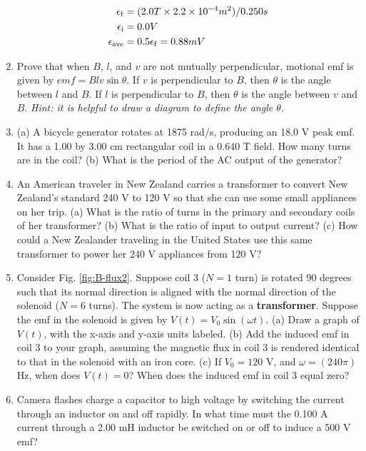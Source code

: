 \documentclass[12pt,twocolumn]{article}
\begin{document}
\begin{enumerate}
\begin{align}
\epsilon_{\rm f} &= (2.0 T \times 2.2\times 10^{-4} m^2)/0.250 s \\
\epsilon_{\rm i} &= 0.0 V \\
\epsilon_{\rm ave} &= 0.5\epsilon_{\rm f} = 0.88 mV
\end{align}
\item Prove that when $B$, $l$, and $v$ are not mutually perpendicular, motional emf is given by $emf = Blv\sin\theta$. If $v$ is perpendicular to $B$, then $\theta$ is the angle between $l$ and $B$. If $l$ is perpendicular to $B$, then $\theta$ is the angle between $v$ and $B$. \textit{Hint: it is helpful to draw a diagram to define the angle $\theta$.}\\ \vspace{6cm}
\item (a) A bicycle generator rotates at 1875 rad/s, producing an 18.0 V peak emf. It has a 1.00 by 3.00 cm rectangular coil in a 0.640 T field. How many turns are in the coil? (b) What is the period of the AC output of the generator?  \\ \vspace{3cm}
\item An American traveler in New Zealand carries a transformer to convert New Zealand's standard 240 V to 120 V so that she can use some small appliances on her trip. (a) What is the ratio of turns in the primary and secondary coils of her transformer? (b) What is the ratio of input to output current? (c) How could a New Zealander traveling in the United States use this same transformer to power her 240 V appliances from 120 V? \\ \vspace{3cm}
\item Consider Fig. \ref{fig:B-flux2}.  Suppose coil 3 ($N=1$ turn) is rotated 90 degrees such that its normal direction is aligned with the normal direction of the solenoid ($N=6$ turns).  The system is now acting as a \textbf{transformer}.  Suppose the emf in the solenoid is given by $V(t) = V_0 \sin(\omega t)$. (a) Draw a graph of $V(t)$, with the x-axis and y-axis units labeled.  (b) Add the induced emf in coil 3 to your graph, assuming the magnetic flux in coil 3 is rendered identical to that in the solenoid with an iron core.  (c) If $V_0 = 120$ V, and $\omega = (240\pi)$ Hz, when does $V(t) = 0$? When does the induced emf in coil 3 equal zero? \\ \vspace{4cm}
\item Camera flashes charge a capacitor to high voltage by switching the current through an inductor on and off rapidly. In what time must the 0.100 A current through a 2.00 mH inductor be switched on or off to induce a 500 V emf? \\ \vspace{1cm}

\end{enumerate}
\end{document}
